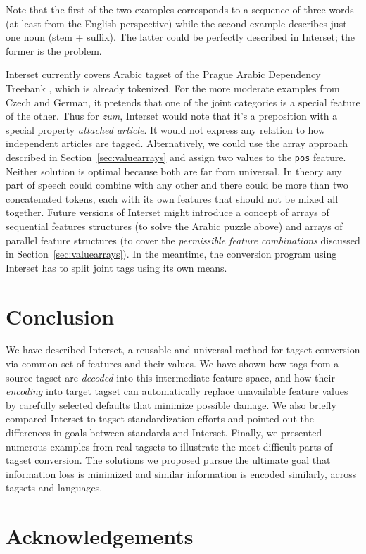 \documentclass[11pt]{article}
\def\Sref#1{Section~\ref{#1}}
\newcommand{\XXX}{\textcolor{red}{XXX }} %
\begin{document}
Note that the first of the two examples corresponds to a sequence of three words (at least from the English perspective) while the second example describes just one noun (stem + suffix). The latter could be perfectly described in Interset; the former is the problem.

Interset currently covers Arabic tagset of the Prague Arabic Dependency Treebank \citep{padt}, which is already tokenized. For the more moderate examples from Czech and German, it pretends that one of the joint categories is a special feature of the other. Thus for \textit{zum}, Interset would note that it's a preposition with a special property \textit{attached article}. It would not express any relation to how independent articles are tagged. Alternatively, we could use the array approach described in \Sref{sec:valuearrays} and assign two values to the \texttt{pos} feature. Neither solution is optimal because both are far from universal. In theory any part of speech could combine with any other and there could be more than two concatenated tokens, each with its own features that should not be mixed all together. Future versions of Interset might introduce a concept of arrays of sequential features structures (to solve the Arabic puzzle above) and arrays of parallel feature structures (to cover the \textit{permissible feature combinations} discussed in \Sref{sec:valuearrays}). In the meantime, the conversion program using Interset has to split joint tags using its own means.


\section{Conclusion}
\label{sec:conclusion}

We have described Interset, a reusable and universal method for tagset conversion via common set of features and their values. We have shown how tags from a source tagset are \textit{decoded} into this intermediate feature space, and how their \textit{encoding} into target tagset can automatically replace unavailable feature values by carefully selected defaults that minimize possible damage. We also briefly compared Interset to tagset standardization efforts and pointed out the differences in goals between standards and Interset. Finally, we presented numerous examples from real tagsets to illustrate the most difficult parts of tagset conversion. The solutions we proposed pursue the ultimate goal that information loss is minimized and similar information is encoded similarly, across tagsets and languages.

\section*{Acknowledgements}


\begin{small}

\end{small}
\end{document}
